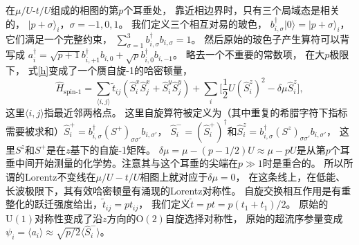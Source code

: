 在$\mu/U$-$t/U$组成的相图的第$p$个耳垂处，
靠近相边界时，只有三个局域态是相关的，
$| p + \sigma \rangle_i$，$\sigma = - 1, 0, 1$。
我们定义三个相互对易的玻色，
$b_{i, \sigma}^{ \dagger} | 0 \rangle = | p + \sigma \rangle_i$，
它们满足一个完整约束，
$\sum_{\sigma=1}^3 b_{i, \sigma}^{ \dagger} b_{i, \sigma} = 1$。
然后原始的玻色子产生算符可以背写成
$a^{ \dagger}_i = \sqrt{p + 1}
b^{ \dagger}_{i, + 1} b_{i, 0} + \sqrt{p} b_{i, 0}^{ \dagger} b_{i, - 1}$。
略去一个不重要的常数项，
在大$p$极限下，
式\eqref{h}变成了一个赝自旋-1的哈密顿量\cite{Altman2002}，
\begin{equation}
  \hat{H}_{\text{spin-1}} = \sum_{\langle i, j \rangle} \tilde{t}_{i   j}
  (\hat{S}_i^x \hat{S}_j^x + \hat{S}_i^y \hat{S}_j^y) +  \sum_i \bigg[\frac{1}{2}U
  (\hat{S}_i^z)^2 - \delta \mu \hat{S}_i^z \bigg], \label{heffspin1}
\end{equation}
这里$\langle i, j \rangle$指最近邻两格点。
这里自旋算符被定义为（其中重复的希腊字符下指标需要被求和）$\hat{S}_i^+ = b_{i, \sigma}^{ \dagger} (S^+)_{\sigma \sigma'} b_{i, \sigma'}$，
$\hat{S}_i^- = (\hat{S}_i^+)^{ \dagger}$和$\hat{S}_i^z = b_{i, \sigma}^{ \dagger} (S^z)_{\sigma \sigma'} b_{i, \sigma'}$，
这里$S^z$和$S^+$是在$z$基下的自旋-1矩阵。
$\delta \mu = \mu - (p - 1 / 2)U \approx \mu - pU$是从第$p$个耳垂中间开始测量的化学势。注意其与这个耳垂的尖端在$p \gg 1$时是重合的。
所以所谓的Lorentz不变线在$\mu / U - t / U$相图上就对应于$\delta \mu = 0$，
在这条线上，在低能、长波极限下，其有效哈密顿量有涌现的Lorentz对称性\cite{Sachdev2017}。
自旋交换相互作用是有重整化的跃迁强度给出，$\tilde{t}_{i   j} = pt_{i   j}$，
我们定义$\tilde{t} = pt = p(t_1+t_1)/2$。
原始的$\mathrm{U} (1)$对称性变成了沿$z$方向的$\mathrm{O} (2)$自旋选择对称性，
原始的超流序参量变成$\psi_i = \langle a_i \rangle \approx \sqrt{p / 2} \langle \hat{S}_i^- \rangle$。


